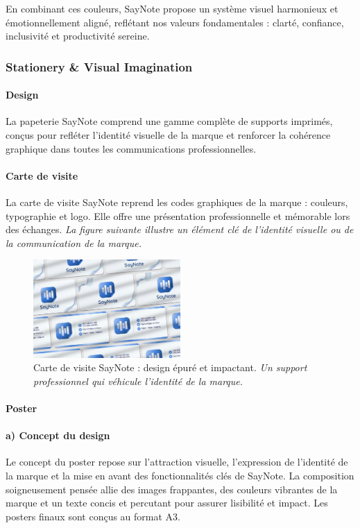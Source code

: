 En combinant ces couleurs, SayNote propose un système visuel harmonieux et émotionnellement aligné, reflétant nos valeurs fondamentales : clarté, confiance, inclusivité et productivité sereine.

\subsubsection{Stationery \& Visual Imagination}
\paragraph{Design}
La papeterie SayNote comprend une gamme complète de supports imprimés, conçus pour refléter l'identité visuelle de la marque et renforcer la cohérence graphique dans toutes les communications professionnelles.

\paragraph*{Carte de visite}
La carte de visite SayNote reprend les codes graphiques de la marque : couleurs, typographie et logo. Elle offre une présentation professionnelle et mémorable lors des échanges.
\noindent
\textit{La figure suivante illustre un élément clé de l'identité visuelle ou de la communication de la marque.}
\begin{figure}[H]
    \centering
    \includegraphics[width=0.5\textwidth]{docs/visual-indentity/pictures/card.jpg}
    \caption{Carte de visite SayNote : design épuré et impactant. \newline\textit{Un support professionnel qui véhicule l'identité de la marque.}}
\end{figure}

\paragraph{Poster}
\paragraph*{a) Concept du design}
Le concept du poster repose sur l'attraction visuelle, l'expression de l'identité de la marque et la mise en avant des fonctionnalités clés de SayNote. La composition soigneusement pensée allie des images frappantes, des couleurs vibrantes de la marque et un texte concis et percutant pour assurer lisibilité et impact. Les posters finaux sont conçus au format A3.

